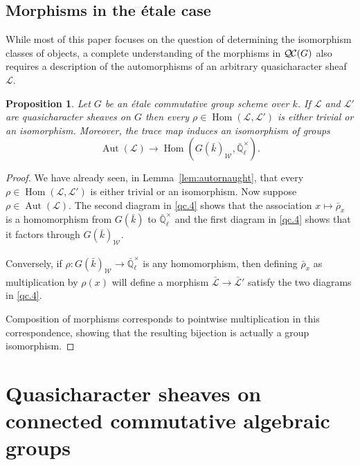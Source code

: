 \documentclass[CM,Submssn,SecEq]{degruyter-crelle} %
\theoremstyle{plain}
\newtheorem{proposition}[theorem]{Proposition}
\theoremstyle{definition}
\theoremstyle{remark}
\newcommand{\EE}{\mathbb{\bar Q}_\ell}
\newcommand{\bFq}{\bar{k}}
\newcommand{\Fq}{k}
\newcommand{\EEx}{\EE^\times}
\newcommand{\Weil}[1]{\mathcal{W}_{#1}}
\DeclareMathOperator{\Aut}{Aut}
\DeclareMathOperator{\Hom}{Hom}
\newcommand{\qcs}[1]{{\mathcal{#1}}}
\newcommand{\gqcs}[1]{{\mathcal{\bar #1}}}
\newcommand{\QC}{{\mathcal{Q\hskip-0.8pt C}}}
\newcommand{\brho}{{\bar\rho}}
\begin{document}
\subsection{Morphisms in the \'etale case}\label{ssec:mor-etale}

While most of this paper focuses on the question of determining the isomorphism classes of objects, a complete understanding of the morphisms in $\QC(G)$ also requires a description of the automorphisms of an arbitrary quasicharacter sheaf $\qcs{L}$.

\begin{proposition}\label{prop:autornaught_etale}
Let $G$ be an \'etale commutative group scheme over $\Fq$.
If $\qcs{L}$ and $\qcs{L}'$ are quasicharacter sheaves on $G$ then
every $\rho\in \Hom(\qcs{L},\qcs{L}')$ is either trivial or an isomorphism. Moreover, the trace map induces an isomorphism of groups
\[
\Aut(\qcs{L}) \to \Hom(G(\bFq)_{\Weil{}}, \EEx).
\]
\end{proposition}

\begin{proof}
We have already seen, in Lemma~\ref{lem:autornaught}, that every $\rho\in \Hom(\qcs{L},\qcs{L}')$ is either trivial or an isomorphism.
Now suppose $\rho \in \Aut(\qcs{L})$.
The second diagram in \ref{qc.4} shows that the association $x \mapsto \brho_x$ is a homomorphism from $G(\bFq)$ to $\EEx$ and the first diagram in \ref{qc.4} shows that it factors through $G(\bFq)_{\Weil{}}$.  

Conversely, if $\rho : G(\bFq)_{\Weil{}} \to \EEx$ is any homomorphism, then defining $\brho_x$ as multiplication by $\rho(x)$ will define a morphism $\gqcs{L} \to \gqcs{L}'$ satisfy the two diagrams in \ref{qc.4}.  

Composition of morphisms corresponds to pointwise multiplication in this correspondence, showing that the resulting bijection is actually a group isomorphism.
\end{proof}


\section{Quasicharacter sheaves on connected commutative algebraic groups} \label{sec:disc-isog}
\end{document}
